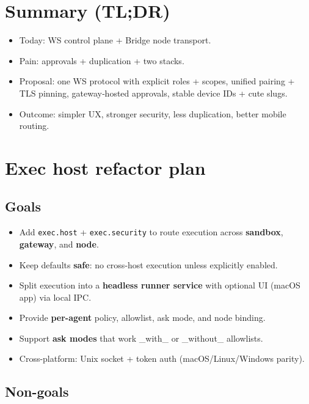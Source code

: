 \hrulefill


\section{Summary (TL;DR)}


\begin{itemize}
  \item Today: WS control plane + Bridge node transport.
  \item Pain: approvals + duplication + two stacks.
  \item Proposal: one WS protocol with explicit roles + scopes, unified pairing + TLS pinning, gateway‑hosted approvals, stable device IDs + cute slugs.
  \item Outcome: simpler UX, stronger security, less duplication, better mobile routing.
\end{itemize}



\clearpage

\section{Exec host refactor plan}


\subsection{Goals}


\begin{itemize}
  \item Add \texttt{exec.host} + \texttt{exec.security} to route execution across \textbf{sandbox}, \textbf{gateway}, and \textbf{node}.
  \item Keep defaults \textbf{safe}: no cross-host execution unless explicitly enabled.
  \item Split execution into a \textbf{headless runner service} with optional UI (macOS app) via local IPC.
  \item Provide \textbf{per-agent} policy, allowlist, ask mode, and node binding.
  \item Support \textbf{ask modes} that work \_with\_ or \_without\_ allowlists.
  \item Cross-platform: Unix socket + token auth (macOS/Linux/Windows parity).
\end{itemize}


\subsection{Non-goals}


